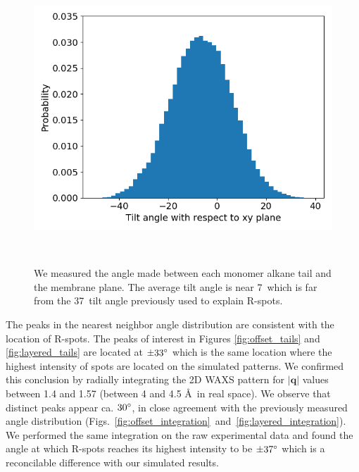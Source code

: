 \documentclass[journal=jpcbfk,manusciprt=article]{achemso}
\begin{document}
  \begin{figure}
  \centering
  \includegraphics[width=0.5\linewidth]{tilt_dist.png}
  \caption{We measured the angle made between each monomer alkane tail and the
	  membrane plane. The average tilt angle is near 7\degree~which is far from the
	  37\degree~tilt angle previously used to explain R-spots.}~\label{fig:tilt}
  \end{figure}

  The peaks in the nearest neighbor angle distribution are consistent with the
  location of R-spots. The peaks of interest in Figures \ref{fig:offset_tails}
  and \ref{fig:layered_tails} are located at $\pm 33 \degree$ which is the same
  location where the highest intensity of spots are located on the simulated
  patterns. We confirmed this conclusion by radially integrating the 2D WAXS
  pattern for $\left|\mathbf{q}\right|$ values between 1.4 and 1.57 (between 4
  and 4.5 \AA~in real space). We observe that distinct peaks appear ca. $30
  \degree$, in close agreement with the previously measured angle distribution
  (Figs.~\ref{fig:offset_integration}~and~\ref{fig:layered_integration}). We
  performed the same integration on the raw experimental data and found the angle
  at which R-spots reaches its highest intensity to be $\pm 37 \degree$ which
  is a reconcilable difference with our simulated results.  
\end{document}
